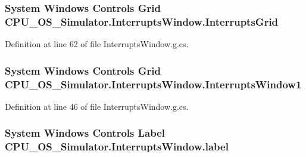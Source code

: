 \subsubsection[{Interrupts\+Grid}]{\setlength{\rightskip}{0pt plus 5cm}System Windows Controls Grid C\+P\+U\+\_\+\+O\+S\+\_\+\+Simulator.\+Interrupts\+Window.\+Interrupts\+Grid\hspace{0.3cm}{\ttfamily [package]}}\label{class_c_p_u___o_s___simulator_1_1_interrupts_window_a759a6e63890b53883639d9b9b40e5688}


Definition at line 62 of file Interrupts\+Window.\+g.\+cs.

\hypertarget{class_c_p_u___o_s___simulator_1_1_interrupts_window_a234d09249cc6ab17ea1d5f6529eaeb4c}{}
\subsubsection[{Interrupts\+Window1}]{\setlength{\rightskip}{0pt plus 5cm}System Windows Controls Grid C\+P\+U\+\_\+\+O\+S\+\_\+\+Simulator.\+Interrupts\+Window.\+Interrupts\+Window1\hspace{0.3cm}{\ttfamily [package]}}\label{class_c_p_u___o_s___simulator_1_1_interrupts_window_a234d09249cc6ab17ea1d5f6529eaeb4c}


Definition at line 46 of file Interrupts\+Window.\+g.\+cs.

\hypertarget{class_c_p_u___o_s___simulator_1_1_interrupts_window_a80190c28f7bf755ea3cc3d286fa7cbde}{}
\subsubsection[{label}]{\setlength{\rightskip}{0pt plus 5cm}System Windows Controls Label C\+P\+U\+\_\+\+O\+S\+\_\+\+Simulator.\+Interrupts\+Window.\+label\hspace{0.3cm}{\ttfamily [package]}}\label{class_c_p_u___o_s___simulator_1_1_interrupts_window_a80190c28f7bf755ea3cc3d286fa7cbde}


